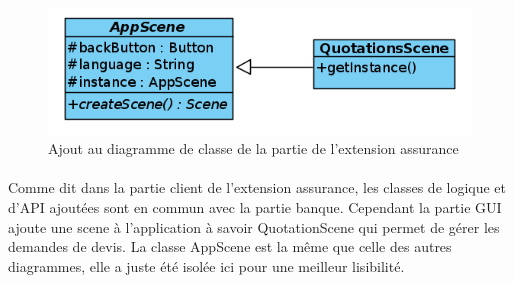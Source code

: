 \documentclass[]{article}
\begin{document}
\begin{figure}[ht]
    \centering
    \includegraphics[scale=0.4]{img/classGUIBanqueAssurance.png}
    \caption{Ajout au diagramme de classe de la partie de l'extension assurance}
    \label{fig1}
    \end{figure}

\paragraph{}Comme dit dans la partie client de l’extension assurance, les classes de logique et d’API ajoutées sont en commun avec la partie banque. Cependant la partie GUI ajoute une scene à l’application à savoir QuotationScene qui permet de gérer les demandes de devis. La classe AppScene est la même que celle des autres diagrammes, elle a juste été isolée ici pour une meilleur lisibilité.
\end{document}
